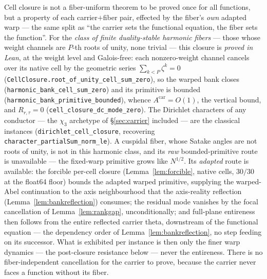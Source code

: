 \documentclass[11pt]{article}
\theoremstyle{definition}
\begin{document}
\noindent Cell closure is not a fiber-uniform theorem to be proved once for all functions, but a property
of each carrier$+$fiber pair, effected by the fiber's \emph{own} adapted warp --- the same split as ``the
carrier sets the functional equation, the fiber sets the function''. For the \emph{class of finite
duality-stable harmonic fibers} --- those whose weight channels are $P$-th roots of unity, none trivial ---
this closure is \emph{proved in Lean}, at the weight level and Galois-free: each nonzero-weight channel
cancels over its native cell by the geometric series $\sum_{k<P}\zeta^k=0$
(\texttt{CellClosure.root\_of\_unity\_cell\_sum\_zero}), so the warped bank closes
(\texttt{harmonic\_bank\_cell\_sum\_zero}) and its primitive is bounded
(\texttt{harmonic\_bank\_primitive\_bounded}), whence $A^{\mathrm{car}}=O(1)$, the vertical bound, and
$R_{r,\tau}=0$ (\texttt{cell\_closure\_dc\_mode\_zero}). The Dirichlet characters of any conductor ---
the $\chi_3$ archetype of \S\ref{sec:carrier} included --- are the classical instances
(\texttt{dirichlet\_cell\_closure}, recovering \texttt{character\_partialSum\_norm\_le}). A cuspidal fiber,
whose Satake angles are not roots of unity, is not in this harmonic class, and its \emph{raw} bounded-primitive
route is unavailable --- the fixed-warp primitive grows like $N^{1/2}$. Its \emph{adapted} route is available:
the forcible per-cell closure (Lemma~\ref{lem:forcible}, native cells, $30/30$ at the float64 floor) bounds the
adapted warped primitive, supplying the warped-Abel continuation to the axis neighbourhood that the axis-reality
reflection (Lemma~\ref{lem:bankreflection}) consumes; the residual mode vanishes by the focal
cancellation of Lemma~\ref{lem:rankgap}, unconditionally; and full-plane entireness then follows from the entire
reflected carrier theta, downstream of the functional equation --- the dependency order of
Lemma~\ref{lem:bankreflection}, no step feeding on its successor.
What is exhibited per instance is then only the finer warp dynamics --- the post-closure resistance below ---
never the entireness. There is no fiber-independent cancellation for the carrier to prove, because the
carrier never faces a function without its fiber.
\end{document}
